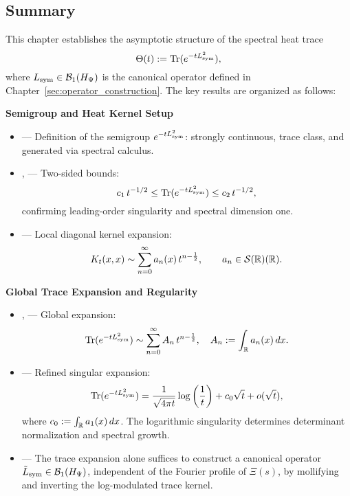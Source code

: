 \subsection*{Summary}

This chapter establishes the asymptotic structure of the spectral heat trace
\[
\Theta(t) := \operatorname{Tr}(e^{-t L_{\mathrm{sym}}^2}),
\]
where \( L_{\mathrm{sym}} \in \mathcal{B}_1(H_{\Psi}) \) is the canonical operator defined in Chapter~\ref{sec:operator_construction}. The key results are organized as follows:

\textbf{Semigroup and Heat Kernel Setup}
\begin{itemize}
  \item {} — Definition of the semigroup \( e^{-t L_{\mathrm{sym}}^2} \): strongly continuous, trace class, and generated via spectral calculus.
  \item {},  — Two-sided bounds:
  \[
  c_1\, t^{-1/2} \leq \operatorname{Tr}(e^{-t L_{\mathrm{sym}}^2}) \leq c_2\, t^{-1/2},
  \]
  confirming leading-order singularity and spectral dimension one.
  \item {} — Local diagonal kernel expansion:
  \[
  K_t(x,x) \sim \sum_{n=0}^\infty a_n(x) \, t^{n - \frac{1}{2}}, \qquad a_n \in \mathcal{S}(\mathbb{R})(\mathbb{R}).
  \]
\end{itemize}

\textbf{Global Trace Expansion and Regularity}
\begin{itemize}
  \item {},  — Global expansion:
  \[
  \operatorname{Tr}(e^{-t L_{\mathrm{sym}}^2}) \sim \sum_{n=0}^\infty A_n \, t^{n - \frac{1}{2}}, \quad A_n := \int_{\mathbb{R}} a_n(x) \, dx.
  \]
  \item {} — Refined singular expansion:
  \[
  \operatorname{Tr}(e^{-t L_{\mathrm{sym}}^2}) = \frac{1}{\sqrt{4\pi t}} \log\left(\frac{1}{t}\right) + c_0 \sqrt{t} + o(\sqrt{t}),
  \]
  where \( c_0 := \int_{\mathbb{R}} a_1(x)\, dx \). The logarithmic singularity determines determinant normalization and spectral growth.
  \item {} — The trace expansion alone suffices to construct a canonical operator \( \tilde{L}_{\mathrm{sym}} \in \mathcal{B}_1(H_{\Psi}) \), independent of the Fourier profile of \( \Xi(s) \), by mollifying and inverting the log-modulated trace kernel.
\end{itemize}

